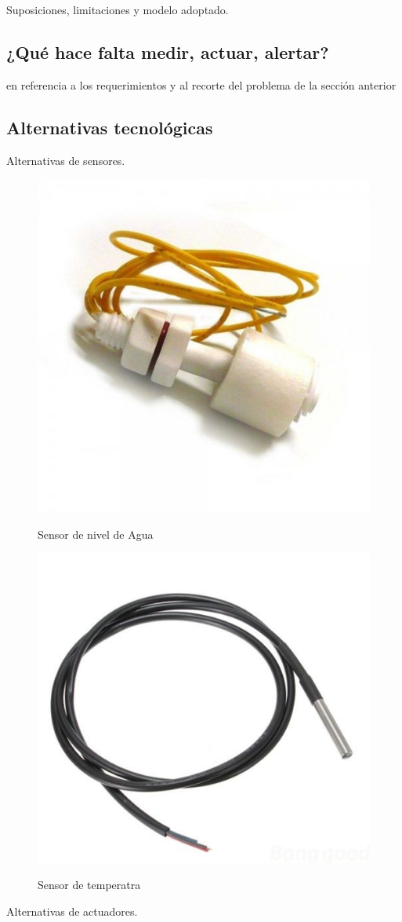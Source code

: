 Suposiciones, limitaciones y modelo adoptado.


\subsection{¿Qué hace falta medir, actuar, alertar?}

en referencia a los requerimientos y al recorte del problema de la sección anterior


\subsection{Alternativas tecnológicas}

Alternativas de sensores.
\begin{figure}[h]
	\centering
    \includegraphics[width=.5\textwidth]{./Figures/sensor_nivel}
	\label{fig:Sensor de nivel}
	\caption{Sensor de nivel de Agua}
\end{figure}

\begin{figure}[h]
	\centering
    \includegraphics[width=.5\textwidth]{./Figures/sensor_temp}
	\label{fig:Sensor de temperatura}
	\caption{Sensor de temperatra}
\end{figure}
Alternativas de actuadores.

